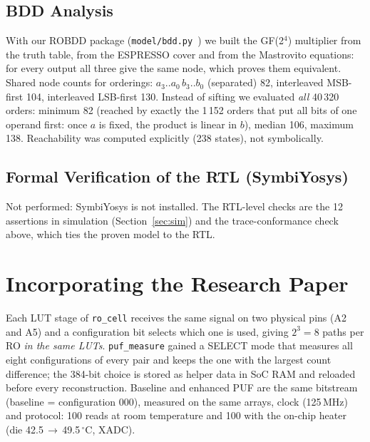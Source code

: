 \documentclass[11pt,a4paper]{article}
\begin{document}
\subsection{BDD Analysis}
With our ROBDD package (\texttt{model/bdd.py}~\cite{bryant86}) we built the GF(2$^4$) multiplier from the
truth table, from the ESPRESSO cover and from the Mastrovito equations: for every output all three give
the same node, which proves them equivalent. Shared node counts for orderings: $a_3..a_0\,b_3..b_0$
(separated) 82, interleaved MSB-first 104, interleaved LSB-first 130. Instead of sifting we evaluated
\emph{all} 40\,320 orders: minimum 82 (reached by exactly the 1\,152 orders that put all bits of one
operand first: once $a$ is fixed, the product is linear in $b$), median 106, maximum 138. Reachability
was computed explicitly (238 states), not symbolically.

\subsection{Formal Verification of the RTL (SymbiYosys)}
Not performed: SymbiYosys is not installed. The RTL-level checks are the 12 assertions in simulation
(Section~\ref{sec:sim}) and the trace-conformance check above, which ties the proven model to the RTL.

\section{Incorporating the Research Paper}
\label{sec:paper}
Each LUT stage of \texttt{ro\_cell} receives the same signal on two physical pins (A2 and A5) and a
configuration bit selects which one is used, giving $2^3=8$ paths per RO \emph{in the same LUTs}.
\texttt{puf\_measure} gained a SELECT mode that measures all eight configurations of every pair and keeps
the one with the largest count difference; the 384-bit choice is stored as helper data in SoC RAM and
reloaded before every reconstruction. Baseline and enhanced PUF are the same bitstream (baseline =
configuration 000), measured on the same arrays, clock (125\,MHz) and protocol: 100 reads at room
temperature and 100 with the on-chip heater (die 42.5\,$\rightarrow$\,49.5\,$^\circ$C, XADC).
\end{document}
